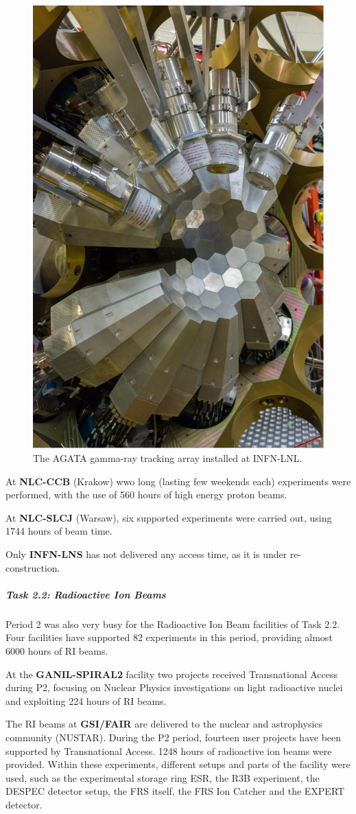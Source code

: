 \begin{figure}[!h]
    \centering
    \includegraphics[width=0.5\linewidth]{graphics/AGATA_LNL.png}
    \caption{The AGATA gamma-ray tracking array installed at INFN-LNL.}
    \label{fig:AGATA_LNL}
\end{figure}

At \textbf{NLC-CCB} (Krakow) wwo long (lasting few weekends each) experiments were performed, with the use of 560 hours of high energy proton beams. 

At \textbf{NLC-SLCJ} (Warsaw), six supported experiments were carried out, using 1744 hours of beam time.

Only \textbf{INFN-LNS} has not delivered any access time, as it is under re-construction.

\subparagraph{Task 2.2: Radioactive Ion Beams} \mbox{}


Period 2 was also very busy for the Radioactive Ion Beam facilities of Task 2.2. Four facilities have supported 82 experiments in this period, providing almost 6000 hours of RI beams. 

At the \textbf{GANIL-SPIRAL2} facility two projects received Transnational Access during P2, focusing on Nuclear Physics investigations on light radioactive nuclei and exploiting 224 hours of RI beams.

The RI beams at \textbf{GSI/FAIR} are delivered to the nuclear and astrophysics community (NUSTAR). During the P2 period, fourteen user projects have been supported by Transnational Access. 1248 hours of radioactive ion beams were provided. Within these experiments, different setups and parts of the facility were used, such as the experimental storage ring ESR, the R3B experiment, the DESPEC detector setup, the FRS itself, the FRS Ion Catcher and the EXPERT detector. 

